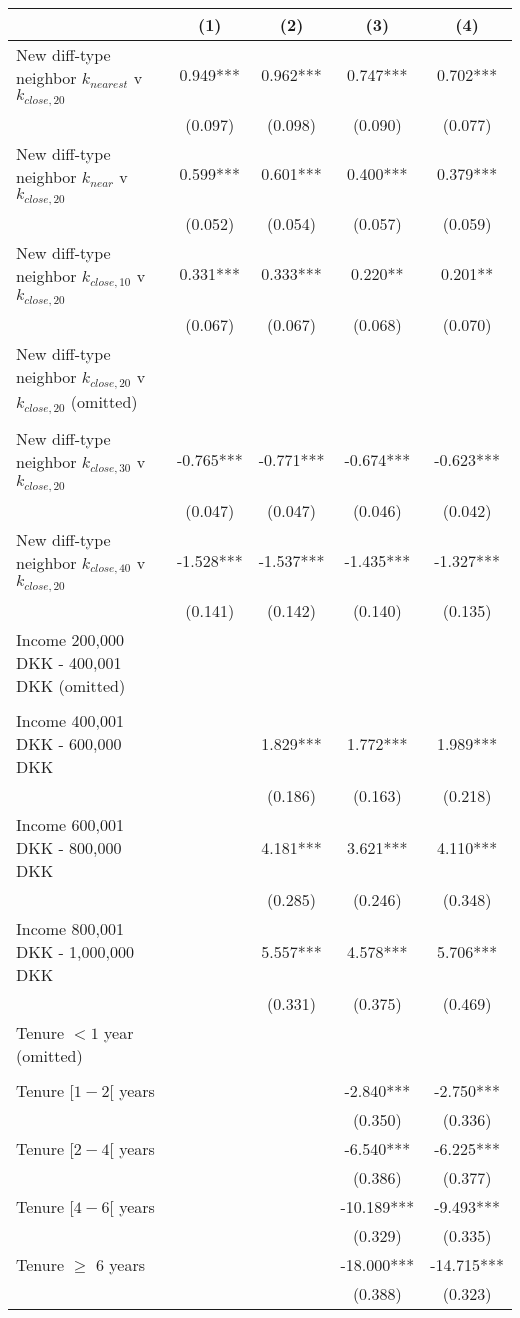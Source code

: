 \begin{tabular}{lcccc}
\toprule
  & (1) & (2) & (3) & (4) \\ 
\midrule
New diff-type neighbor $k_{nearest}$ v $k_{close,20}$ & 0.949*** & 0.962*** & 0.747*** & 0.702*** \\ 
 & (0.097) & (0.098) & (0.090) & (0.077) \\ 
New diff-type neighbor $k_{near}$ v $k_{close,20}$ & 0.599*** & 0.601*** & 0.400*** & 0.379*** \\ 
 & (0.052) & (0.054) & (0.057) & (0.059) \\ 
New diff-type neighbor $k_{close,10}$ v $k_{close,20}$ & 0.331*** & 0.333*** & 0.220** & 0.201** \\ 
 & (0.067) & (0.067) & (0.068) & (0.070) \\ 
New diff-type neighbor $k_{close ,20}$ v $k_{close ,20}$ (omitted) &  &  &  & \\ 
 &  &  &  &  \\ 
New diff-type neighbor $k_{close,30}$ v $k_{close,20}$ & -0.765*** & -0.771*** & -0.674*** & -0.623*** \\ 
 & (0.047) & (0.047) & (0.046) & (0.042) \\ 
New diff-type neighbor $k_{close,40}$ v $k_{close,20}$ & -1.528*** & -1.537*** & -1.435*** & -1.327*** \\ 
 & (0.141) & (0.142) & (0.140) & (0.135) \\ 
Income 200,000 DKK - 400,001 DKK (omitted) &  & & & \\ 
 &  & & & \\ 
Income 400,001 DKK - 600,000 DKK &  & 1.829*** & 1.772*** & 1.989*** \\ 
 &  & (0.186) & (0.163) & (0.218) \\ 
Income 600,001 DKK - 800,000 DKK &  & 4.181*** & 3.621*** & 4.110*** \\ 
 &  & (0.285) & (0.246) & (0.348) \\ 
Income 800,001 DKK - 1,000,000 DKK &  & 5.557*** & 4.578*** & 5.706*** \\ 
 &  & (0.331) & (0.375) & (0.469) \\ 

Tenure $<1$ year (omitted) &  &  &  &  \\ 
 &  &  &  & \\ 

Tenure $[1-2[$ years &  &  & -2.840*** & -2.750*** \\ 
 &  &  & (0.350) & (0.336) \\ 
Tenure $[2-4[$ years &  &  & -6.540*** & -6.225*** \\ 
 &  &  & (0.386) & (0.377) \\ 
Tenure $[4-6[$ years &  &  & -10.189*** & -9.493*** \\ 
 &  &  & (0.329) & (0.335) \\ 
Tenure $\geq$ 6 years &  &  & -18.000*** & -14.715*** \\ 
 &  &  & (0.388) & (0.323) \\ 


\end{tabular}

